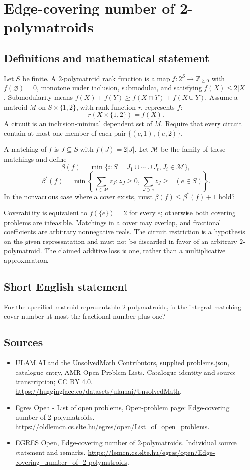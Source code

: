 \documentclass[11pt,a4paper]{article}
\begin{document}
\section*{Edge-covering number of 2-polymatroids}\label{statement}

\subsection{Definitions and mathematical statement}
Let $S$ be finite. A $2$-polymatroid rank function is a map
$f:2^S\to\mathbb Z_{\ge0}$ with $f(\varnothing)=0$, monotone under
inclusion, submodular, and satisfying $f(X)\le2|X|$. Submodularity means
$f(X)+f(Y)\ge f(X\cap Y)+f(X\cup Y)$.
Assume a matroid $M$ on $S\times\{1,2\}$, with rank function $r$,
represents $f$:
\[
                    r(X\times\{1,2\})=f(X).
\]
A circuit is an inclusion-minimal dependent set of $M$. Require that
every circuit contain at most one member of each pair
$\{(e,1),(e,2)\}$.

A matching of $f$ is $J\subseteq S$ with $f(J)=2|J|$.
Let $\mathcal M$ be the family of these matchings and define
\[
 \beta(f)=\min\{t:S=J_1\cup\cdots\cup J_t, J_i\in\mathcal M\},
\]
\[
 \beta^*(f)=\min\left\{\sum_{J\in\mathcal M}z_J:
 z_J\ge0,\ \sum_{J\ni e}z_J\ge1\ (e\in S)\right\}.
\]
In the nonvacuous case where a cover exists, must
$\beta(f)\le\beta^*(f)+1$ hold?

Coverability is equivalent to $f(\{e\})=2$ for every $e$; otherwise
both covering problems are infeasible. Matchings in a cover may overlap,
and fractional coefficients are arbitrary nonnegative reals. The
circuit restriction is a hypothesis on the given representation and
must not be discarded in favor of an arbitrary $2$-polymatroid. The
claimed additive loss is one, rather than a multiplicative approximation.
\subsection{Short English statement}
For the specified matroid-representable 2-polymatroids, is the integral matching-cover number at most the fractional number plus one?
\subsection{Sources}
\begin{itemize}
\item[S1] ULAM.AI and the UnsolvedMath Contributors, supplied problems.json, catalogue entry, AMR Open Problem Lists. Catalogue identity and source transcription; CC BY 4.0.
\url{https://huggingface.co/datasets/ulamai/UnsolvedMath}.
\item[S2] Egres Open - List of open problems, Open-problem page: Edge-covering number of 2-polymatroids. 
\url{https://oldlemon.cs.elte.hu/egres/open/List_of_open_problems}.
\item[S3] EGRES Open, Edge-covering number of 2-polymatroids. Individual source statement and remarks.
\url{https://lemon.cs.elte.hu/egres/open/Edge-covering_number_of_2-polymatroids}.
\end{itemize}
\end{document}
